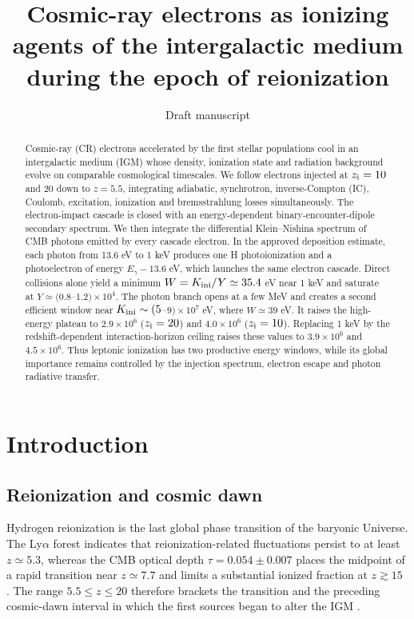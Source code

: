 \documentclass[10pt,twocolumn]{article}
\title{\vspace{-0.8cm}\bf Cosmic-ray electrons as ionizing agents of the
intergalactic medium during the epoch of reionization}
\author{\small Draft manuscript}
\date{}
\newcommand{\Ki}{K_{\rm ini}}
\newcommand{\zi}{z_{\rm i}}
\begin{document}
\maketitle
\vspace{-0.6cm}

\begin{abstract}
Cosmic-ray (CR) electrons accelerated by the first stellar populations cool in
an intergalactic medium (IGM) whose density, ionization state and radiation
background evolve on comparable cosmological timescales. We follow electrons
injected at $\zi=10$ and 20 down to $z=5.5$, integrating adiabatic,
synchrotron, inverse-Compton (IC), Coulomb, excitation, ionization and
bremsstrahlung losses simultaneously. The electron-impact cascade is closed
with an energy-dependent binary-encounter-dipole secondary spectrum. We then
integrate the differential Klein--Nishina spectrum of CMB photons emitted by
every cascade electron. In the approved deposition estimate, each photon from
13.6 eV to 1 keV produces one H photoionization and a photoelectron of energy
$E_\gamma-13.6$ eV, which launches the same electron cascade. Direct collisions
alone yield a minimum $W=\Ki/Y\simeq35.4$ eV near 1 keV and saturate at
$Y\simeq(0.8$--$1.2)\times10^4$. The photon branch opens at a few MeV and
creates a second efficient window near $\Ki\sim(5$--$9)\times10^7$ eV, where
$W\simeq39$ eV. It raises the high-energy plateau to $2.9\times10^6$
($\zi=20$) and $4.0\times10^6$ ($\zi=10$). Replacing 1 keV by the
redshift-dependent interaction-horizon ceiling raises these values to
$3.9\times10^6$ and $4.5\times10^6$. Thus leptonic ionization has two
productive energy windows, while its global importance remains controlled by
the injection spectrum, electron escape and photon radiative transfer.
\end{abstract}

\section{Introduction}

\subsection{Reionization and cosmic dawn}

Hydrogen reionization is the last global phase transition of the baryonic
Universe. The Ly$\alpha$ forest indicates that reionization-related
fluctuations persist to at least $z\simeq5.3$, whereas the CMB optical depth
$\tau=0.054\pm0.007$ places the midpoint of a rapid transition near
$z\simeq7.7$ and limits a substantial ionized fraction at $z\gtrsim15$
\citep{Bosman2022,Planck2020}. The range $5.5\le z\le20$ therefore brackets
the transition and the preceding cosmic-dawn interval in which the first
sources began to alter the IGM \citep{Robertson2022,Klessen2023}.
\end{document}
